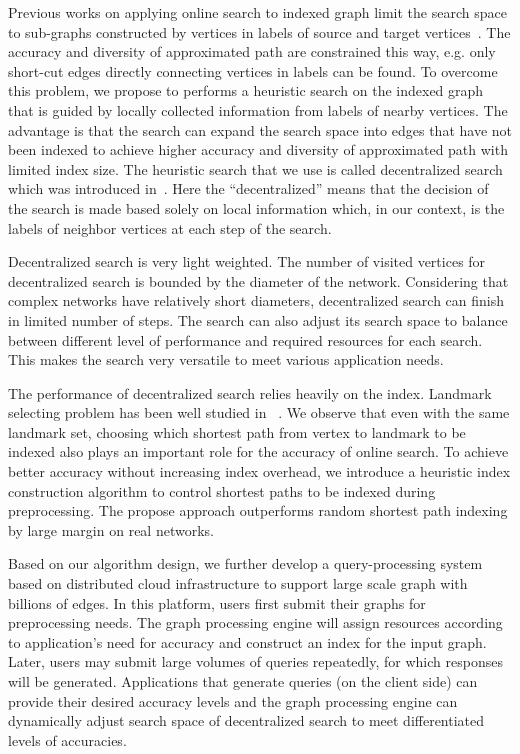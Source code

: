 Previous works on applying online search to indexed graph limit the search space to sub-graphs constructed by vertices in labels of source and target vertices~\cite{Gubichev:2010:FAE:1871437.1871503, 6399472}. The accuracy and diversity of approximated path are constrained this way, e.g. only short-cut edges directly connecting vertices in labels can be found. To overcome this problem, we propose to performs a heuristic search on the indexed graph that is guided by locally collected information from labels of nearby vertices. The advantage is that the search can expand the search space into edges that have not been indexed to achieve higher accuracy and diversity of approximated path with limited index size. The heuristic search that we use is called decentralized search which was introduced in~\cite{Kleinberg:2000p5066, kleinberg2006complex}. Here the "`decentralized"' means that the decision of the search is made based solely on local information which, in our context, is the labels of neighbor vertices at each step of the search.

Decentralized search is very light weighted. The number of visited vertices for decentralized search is bounded by the diameter of the network. Considering that complex networks have relatively short diameters, decentralized search can finish in limited number of steps. The search can also adjust its search space to balance between different level of performance and required resources for each search. This makes the search very versatile to meet various application needs.  

The performance of decentralized search relies heavily on the index. Landmark selecting problem has been well studied in ~\cite{Potamias:2009:FSP:1645953.1646063,6927522}. We observe that even with the same landmark set, choosing which shortest path from vertex to landmark to be indexed also plays an important role for the accuracy of online search. To achieve better accuracy without increasing index overhead, we introduce a heuristic index construction algorithm to control shortest paths to be indexed during preprocessing. The propose approach outperforms random shortest path indexing by large margin on real networks.

Based on our algorithm design, we further develop a query-processing system based on distributed cloud infrastructure to support large scale graph with billions of edges. In this platform, users first submit their graphs for preprocessing needs. The graph processing engine will assign resources according to application's need for accuracy and construct an index for the input graph. Later, users may submit large volumes of queries repeatedly, for which responses will be generated. Applications that generate queries (on the client side) can provide their desired accuracy levels and the graph processing engine can dynamically adjust search space of decentralized search to meet differentiated levels of accuracies.


